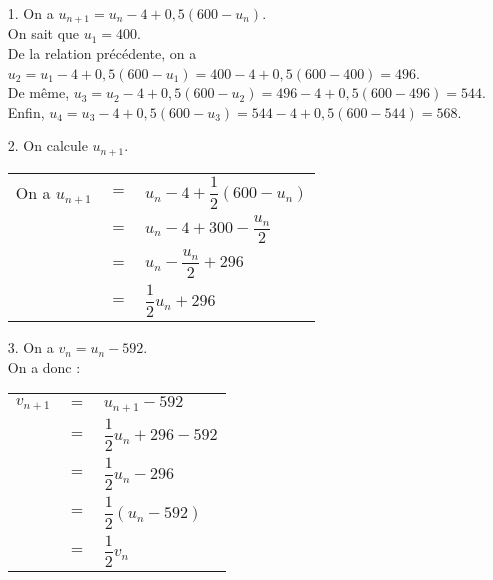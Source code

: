 \begin{itemize}
\item[1.] On a $u_{n+1} = u_n - 4 + 0,5\left(600-u_n\right)$. \\

On sait que $u_1 = 400$. \\
De la relation précédente, on a $u_2 = u_1 - 4 + 0,5\left(600-u_1\right) = 400 - 4 + 0,5\left(600-400\right) = 496$. \\
De même, $u_3 = u_2 - 4 + 0,5\left(600-u_2\right) = 496 - 4 + 0,5\left(600-496\right) = 544$. \\
Enfin, $u_4 = u_3 - 4 + 0,5\left(600-u_3\right) = 544 - 4 + 0,5\left(600 - 544\right) = 568$. \\

\item[2.] On calcule $u_{n+1}$. \\

\begin{tabular}{lll}
\hspace*{-.3cm} On a $u_{n+1}$ & $=$ & $u_n - 4 + \dfrac{1}{2}\left(600 - u_n\right)$ \vspace*{.3cm} \\
& $=$ & $u_n - 4 + 300 - \dfrac{u_n}{2}$ \vspace*{.3cm} \\
& $=$ & $u_n - \dfrac{u_n}{2} + 296$ \vspace*{.3cm} \\
& $=$ & $\dfrac{1}{2}u_n + 296$ \\ 
\end{tabular}


\newpage

\item[3.] On a $v_n = u_n - 592$. \\

On a donc : \\

\begin{tabular}{lll}
\hspace*{-.3cm} $v_{n+1}$ & $=$ & $u_{n+1} - 592$ \vspace*{.3cm} \\
& $=$ & $\dfrac{1}{2}u_n + 296 - 592$ \vspace*{.3cm} \\
& $=$ & $\dfrac{1}{2}u_n - 296$ \vspace*{.3cm} \\
& $=$ & $\dfrac{1}{2}\left(u_n - 592\right)$ \vspace*{.3cm} \\
& $=$ & $\dfrac{1}{2}v_n$ \\
\end{tabular}


\end{itemize}

